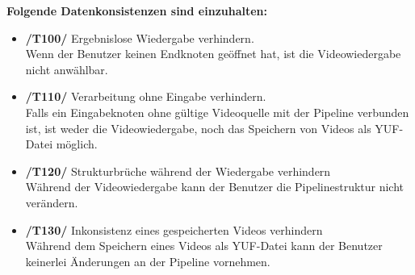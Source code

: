 \newpage

\textbf{Folgende Datenkonsistenzen sind einzuhalten:}
\begin{itemize}
	\item\textbf{/T100/} Ergebnislose Wiedergabe verhindern. ~\\
		Wenn der Benutzer keinen Endknoten geöffnet hat, ist die Videowiedergabe nicht anwählbar.
	\item\textbf{/T110/} Verarbeitung ohne Eingabe verhindern. ~\\
		Falls ein Eingabeknoten ohne gültige Videoquelle mit der Pipeline verbunden ist, ist weder die Videowiedergabe, noch das Speichern von Videos als YUF-Datei möglich.
	\item\textbf{/T120/} Strukturbrüche während der Wiedergabe verhindern ~\\
		Während der Videowiedergabe kann der Benutzer die Pipelinestruktur nicht verändern.
	\item\textbf{/T130/} Inkonsistenz eines gespeicherten Videos verhindern ~\\
		Während dem Speichern eines Videos als YUF-Datei kann der Benutzer keinerlei Änderungen an der Pipeline vornehmen.
\end{itemize}